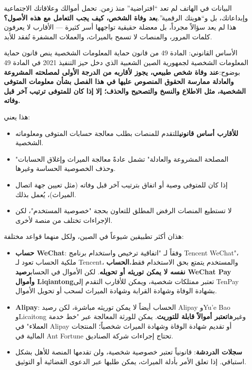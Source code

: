 البيانات في الهاتف لم تعد “افتراضية” منذ زمن. تحمل أموالك وعلاقاتك الاجتماعية وإبداعاتك، بل و“هويتك الرقمية”.\textbf{بعد وفاة الشخص، كيف يجب التعامل مع هذه الأصول؟}هذا لم يعد سؤالاً مجرداً، بل معضلة حقيقية تواجهها أسر كثيرة — الأقارب لا يعرفون كلمات المرور، والمنصات لا تسمح بالميراث، والعملات المشفرة تُفقد للأبد.

\begin{tcbinfo}{الأساس القانوني: المادة 49 من قانون حماية المعلومات الشخصية}
ينص قانون حماية المعلومات الشخصية لجمهورية الصين الشعبية الذي دخل حيز التنفيذ 2021 في المادة 49 بوضوح:\textbf{عند وفاة شخص طبيعي، يجوز لأقاربه من الدرجة الأولى لمصلحته المشروعة والعادلة ممارسة الحقوق المنصوص عليها في هذا الفصل بشأن معلومات المتوفى الشخصية، مثل الاطلاع والنسخ والتصحيح والحذف؛ إلا إذا كان للمتوفى ترتيب آخر قبل وفاته.}

هذا يعني:

\begin{itemize}
  \item \textbf{للأقارب أساس قانوني}للتقدم للمنصات بطلب معالجة حسابات المتوفى ومعلوماته الشخصية.
  \item "المصلحة المشروعة والعادلة" تشمل عادةً معالجة الميراث وإغلاق الحسابات وحذف الخصوصية الحساسة وغيرها.
  \item إذا كان للمتوفى وصية أو اتفاق بترتيب آخر قبل وفاته (مثل تعيين جهة اتصال الميراث)، يُعمل بذلك.
  \item لا تستطيع المنصات الرفض المطلق للتعاون بحجة "خصوصية المستخدم"، لكن الإجراءات تختلف من منصة لأخرى.
\end{itemize}

\end{tcbinfo}


هذان أكثر تطبيقين شيوعاً في الصين، ولكل منهما قواعد مختلفة:

\begin{itemize}
  \item \textbf{حساب WeChat}: وفقاً لـ "اتفاقية ترخيص واستخدام برنامج Tencent WeChat"، ملكية الحساب تعود لـ Tencent، والمستخدم يتمتع بحق الاستخدام فقط،\textbf{الحساب نفسه لا يمكن توريثه أو تحويله}. لكن الأموال في الحساب\textbf{رصيد WeChat Pay وأموال Liqiantong}تعتبر ممتلكات شخصية، ويمكن للأقارب التقدم إلى TenPay بشهادة الوفاة وشهادة القرابة وشهادة الميراث لسحب أو تحويل الأموال.
  \item \textbf{Alipay}: الحساب أيضاً لا يمكن توريثه مباشرة، لكن رصيد Alipay وYu'e Bao وLicaitong وغيرها\textbf{تعتبر أموالاً قابلة للتوريث}. يمكن للورثة المعالجة عبر "خط خدمة العملاء" في Alipay أو تقديم شهادة الوفاة وشهادة الميراث شخصياً؛ المنتجات المالية في Ant Fortune تحتاج إجراءات شركة الصناديق.
  \item \textbf{سجلات الدردشة}: قانونياً تعتبر خصوصية شخصية، ولن تقدمها المنصة للأهل بشكل استباقي. إذا تعلق الأمر بأدلة الميراث، يمكن طلبها عبر الدعوى القضائية أو التوثيق.
\end{itemize}

